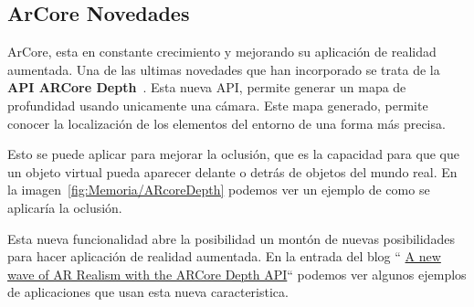 \subsection{ArCore Novedades}
ArCore, esta en constante crecimiento y mejorando su aplicación de realidad aumentada. Una de las ultimas novedades que han incorporado se trata de la \textbf{API ARCore Depth}~\cite{apiArCoreDepth}. Esta nueva API, permite generar un mapa de profundidad usando unicamente una cámara. Este mapa generado, permite conocer la localización de los elementos del entorno de una forma más precisa.

Esto se puede aplicar para mejorar la oclusión, que es la capacidad para que que un objeto virtual pueda aparecer delante o detrás de objetos del mundo real. En la imagen~\ref{fig:Memoria/ARcoreDepth} podemos ver un ejemplo de como se aplicaría la oclusión.

Esta nueva funcionalidad abre la posibilidad un montón de nuevas posibilidades para hacer aplicación de realidad aumentada. En la entrada del blog `` \href{https://developers.googleblog.com/2020/06/a-new-wave-of-ar-realism-with-arcore-depth-api.html}{A new wave of AR Realism with the ARCore Depth API}`` podemos ver algunos ejemplos de aplicaciones que usan esta nueva caracteristica.


